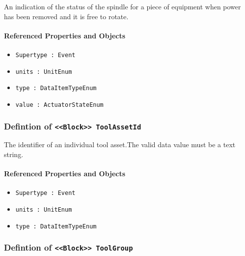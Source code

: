 \FloatBarrier

An indication of the status of the spindle for a piece of equipment when power has been removed and it is free to rotate.

\FloatBarrier
\paragraph{Referenced Properties and Objects}

\begin{itemize}
\item \texttt{Supertype : Event}

\item \texttt{units : UnitEnum}

\item \texttt{type : DataItemTypeEnum}

\item \texttt{value : ActuatorStateEnum}

\end{itemize}
\FloatBarrier
\subsubsection{Defintion of \texttt{<<Block>> ToolAssetId}}
  \label{type:ToolAssetId}

\FloatBarrier

The identifier of an individual tool asset.The valid data value must be a text string.

\FloatBarrier
\paragraph{Referenced Properties and Objects}

\begin{itemize}
\item \texttt{Supertype : Event}

\item \texttt{units : UnitEnum}

\item \texttt{type : DataItemTypeEnum}

\end{itemize}
\FloatBarrier
\subsubsection{Defintion of \texttt{<<Block>> ToolGroup}}
  \label{type:ToolGroup}

\FloatBarrier

